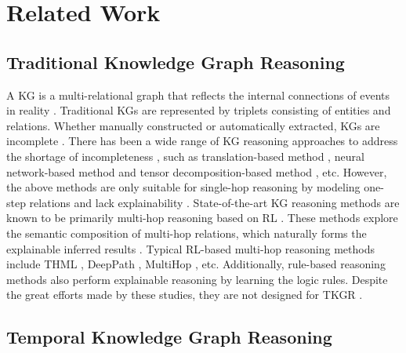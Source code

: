 \documentclass[sigconf,natbib=true]{acmart}
\begin{document}


\section{Related Work}
\subsection{Traditional Knowledge Graph  Reasoning} 
A KG is a multi-relational graph that reflects the internal connections of events in reality \cite{kgsurvey}. Traditional KGs are represented by triplets consisting of entities and relations. Whether manually constructed or automatically extracted, KGs are incomplete \cite{MultiHop, tkgc-survey}.  %
There has been a wide range of KG reasoning approaches to address the shortage of incompleteness  \cite{kgr_survey}, such as translation-based method \cite{TransE}, neural network-based method \cite{kgrnn} and tensor decomposition-based method \cite{decompkgr}, etc. However, the above methods are only suitable for single-hop reasoning by modeling one-step relations and lack explainability \cite{RLH}. State-of-the-art KG reasoning methods are known to be primarily multi-hop reasoning based on RL \cite{MINERVA}. These methods explore the semantic composition of multi-hop relations, which naturally forms the  explainable inferred results \cite{kgr_survey}. Typical RL-based multi-hop reasoning methods include THML \cite{THML}, DeepPath \cite{DeepPath}, MultiHop \cite{MultiHop}, etc.  %
Additionally, rule-based reasoning methods \cite{NeuralLP, RNNLogic} also perform explainable reasoning by learning the logic rules. Despite the great efforts made by these studies, they are not  designed for TKGR \cite{RE-NET, TiTer}.
 

\subsection{Temporal Knowledge Graph Reasoning} 
\end{document}
